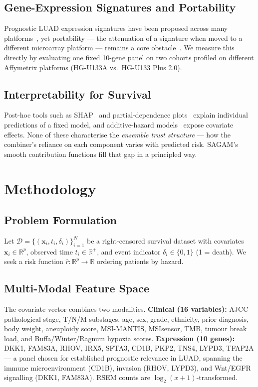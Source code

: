 \documentclass[journal]{IEEEtran}
\begin{document}
\subsection{Gene-Expression Signatures and Portability}
Prognostic LUAD expression signatures have been proposed across many
platforms~\cite{shedden2008gene,beer2002gene}, yet portability --- the
attenuation of a signature when moved to a different microarray platform ---
remains a core obstacle~\cite{luo2010comparison}. We measure this directly by
evaluating one fixed 10-gene panel on two cohorts profiled on different
Affymetrix platforms (HG-U133A vs.\ HG-U133 Plus 2.0).

\subsection{Interpretability for Survival}
Post-hoc tools such as SHAP~\cite{lundberg2017unified} and partial-dependence
plots~\cite{friedman2001greedy} explain individual predictions of a fixed
model, and additive-hazard models~\cite{aalen1989linear} expose covariate
effects. None of these characterise the \emph{ensemble trust structure} ---
how the combiner's reliance on each component varies with predicted risk.
SAGAM's smooth contribution functions fill that gap in a principled way.

\section{Methodology}
\label{sec:method}

\subsection{Problem Formulation}
Let $\mathcal{D}=\{(\mathbf{x}_i,t_i,\delta_i)\}_{i=1}^N$ be a right-censored
survival dataset with covariates $\mathbf{x}_i\in\mathbb{R}^p$, observed time
$t_i\in\mathbb{R}^{+}$, and event indicator $\delta_i\in\{0,1\}$ (1 = death).
We seek a risk function $\hat r:\mathbb{R}^p\!\to\!\mathbb{R}$ ordering patients
by hazard.

\subsection{Multi-Modal Feature Space}
\label{sec:features}
The covariate vector combines two modalities.
\textbf{Clinical (16 variables):} AJCC pathological stage, T/N/M substages,
age, sex, grade, ethnicity, prior diagnosis, body weight, aneuploidy score,
MSI-MANTIS, MSIsensor, TMB, tumour break load, and Buffa/Winter/Ragnum hypoxia
scores. \textbf{Expression (10 genes):} DKK1, FAM83A, RHOV, IRX5, SFTA3, CD1B,
PKP2, TNS4, LYPD3, TFAP2A --- a panel chosen for established prognostic
relevance in LUAD, spanning the immune microenvironment (CD1B), invasion
(RHOV, LYPD3), and Wnt/EGFR signalling (DKK1, FAM83A). RSEM counts are
$\log_2(x{+}1)$-transformed.
\end{document}
